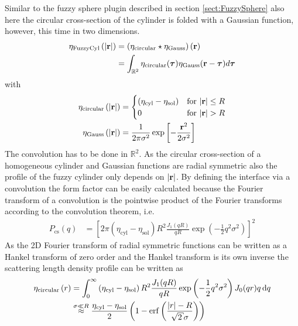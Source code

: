 Similar to the fuzzy sphere plugin described in section \ref{sect:FuzzySphere} also here the circular cross-section of the cylinder is folded with a Gaussian function, however, this time in two dimensions.
\begin{align}
\eta_\text{FuzzyCyl}\left(\abs{\mathbf{r}}\right)
        &= \left(\eta_\text{circular}\star\eta_\text{Gauss}\right)(\mathbf{r}) \nonumber \\
        &= \int_{\mathbb{R}^2}\eta_\text{circular}(\boldsymbol{\tau}) \eta_\text{Gauss}(\mathbf{r}-\boldsymbol{\tau}) d\boldsymbol{\tau}
\end{align}
with
\begin{subequations}
\begin{align}
\eta_\text{circular}\left(\abs{\mathbf{r}}\right) &=
\begin{cases}
\left(\eta_\text{cyl}-\eta_\text{sol}\right) & \mbox{for~} \abs{\mathbf{r}}\leq R \\
0 & \mbox{for~} \abs{\mathbf{r}}>R
\end{cases} \\
\eta_\text{Gauss}\left(\abs{\mathbf{r}}\right) &= \frac{1}{2 \pi
\sigma^2} \exp\left[ -\frac{\mathbf{r}^2}{2\sigma^2}\right]
\end{align}
\end{subequations}
The convolution has to be done in $\mathbb{R}^2$. As the circular
cross-section of a homogeneous cylinder and Gaussian functions are radial symmetric also the
profile of the fuzzy cylinder only depends on $\abs{\mathbf{r}}$. By
defining the interface via a convolution the form factor can be
easily calculated because the Fourier transform of a convolution
is the pointwise product of the Fourier transforms according to
the convolution theorem, i.e.
\begin{align}\label{eq:Pcs:cyl_fuzzy}
  P_\mathrm{cs}(q) &= \left[2\pi \left(\eta_\text{cyl}-\eta_\text{sol}\right) R^2\frac{J_1(qR)}{qR} \exp\left(-\frac12 q^2\sigma^2\right)\right]^2
\end{align}
As the 2D Fourier transform of radial symmetric functions can be written as a Hankel transform of zero order \cite{Kohlbrecher2017}
and the Hankel transform is its own inverse the scattering length density profile can be written as
\begin{align}
\eta_\text{circular}\left(r\right) &= \int_0^\infty \left(\eta_\text{cyl}-\eta_\text{sol}\right) R^2\frac{J_1(qR)}{qR} \exp\left(-\frac12 q^2\sigma^2\right) J_0(qr) q \, \mathrm{d}q \\
&\overset{\sigma \ll R}{\approx}
  \frac{\eta_\text{cyl}-\eta_\text{sol}}{2}\left(1-\mathrm{erf}\left(\frac{\abs{r}-R}{\sqrt{2}\sigma}\right)\right)
\end{align}

